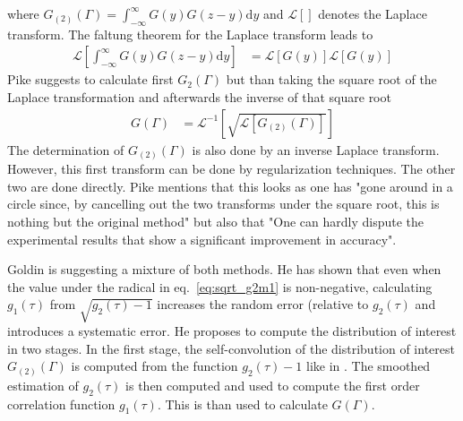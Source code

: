 where $G_{(2)}(\Gamma)=\int_{-\infty}^\infty G(y) G(z-y) \mathrm{d}y$ and $\mathcal{L}\left[\right]$ denotes the Laplace transform. The faltung theorem for the Laplace transform leads to
\begin{align}
 \mathcal{L}\left[\int_{-\infty}^\infty G(y) G(z-y) \mathrm{d}y\right] &= \mathcal{L}\left[G(y)\right] \mathcal{L}\left[G(y)\right]
\end{align}
Pike \cite{Pike2002}  suggests to calculate first $G_2(\Gamma)$ but than taking the square root of the Laplace transformation and afterwards the inverse of that square root
\begin{align}
G(\Gamma) &=
\mathcal{L}^{-1}\left[\sqrt{\mathcal{L}\left[G_{(2)}(\Gamma)\right]}\right]
\end{align}
The determination of $G_{(2)}(\Gamma)$ is also done by an inverse Laplace transform. However, this first transform can be done by regularization techniques. The other two are done directly. Pike \cite{Pike2002} mentions that this looks as one has "gone around in a circle since, by cancelling out the two transforms under the square root, this is nothing but the original method" but also that "One can hardly dispute the experimental results
that show a significant improvement in accuracy".


 Goldin \cite{Goldin1991} is suggesting a mixture of both methods. He has shown that even when the value under the radical in eq.\ \ref{eq:sqrt_g2m1} is non-negative, calculating $g_1(\tau)$ from $\sqrt{g_2(\tau)-1}$ increases the random error (relative to $g_2(\tau)$ and introduces a systematic error. He proposes to compute the distribution of interest in two stages. In the first stage, the self-convolution of the distribution of interest $G_{(2)}(\Gamma)$ is computed from the function $g_2(\tau)-1$ like in \cite{Pike2002}. The smoothed estimation of $g_2(\tau)$ is then computed and used to compute the first order correlation function $g_1(\tau)$. This is than used to calculate $G(\Gamma)$.

